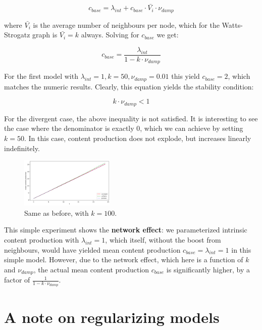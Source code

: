 \documentclass[final,5p,times,twocolumn,authoryear]{elsarticle}
\begin{document}
\begin{equation}
    c_{base} = \lambda_{int} + c_{base} \cdot \bar{V_i} \cdot \nu_{damp}
\end{equation}

where $\bar{V_i}$ is the average number of neighbours per node, which for the Watts-Strogatz graph is $\bar{V_i} = k$ always. Solving for $c_{base}$ we get:

\begin{equation}
    c_{base} = \frac{\lambda_{int}}{ 1 - k \cdot \nu_{damp} }
\end{equation}

For the first model with $\lambda_{int} = 1, k = 50, \nu_{damp} = 0.01$ this yield $c_{base}=2$, which matches the numeric results. Clearly, this equation yields the stability condition:

\begin{equation}
    k \cdot \nu_{damp} < 1
\end{equation}

For the divergent case, the above inequality is not satisfied. It is interesting to see the case where the denominator is exactly 0, which we can achieve by setting $k=50$. In this case, content production does not explode, but increases linearly indefinitely.

\begin{figure}[h]
	\centering 
	\includegraphics[width=0.4\textwidth]{figure-5.png}	
	\caption{Same as before, with $k=100$.} 
\end{figure}

This simple experiment shows the \textbf{network effect}: we parameterized intrinsic content production with $\lambda_{int}=1$, which itself, without the boost from neighbours, would have yielded mean content production $c_{base} = \lambda_{int} = 1 $ in this simple model. However, due to the network effect, which here is a function of $k$ and $\nu_{damp}$, the actual mean content production $c_{base}$ is significantly higher, by a factor of $ \frac{ 1 }{ 1 - k \cdot \nu_{damp} } $.

\section{A note on regularizing models}
\end{document}

